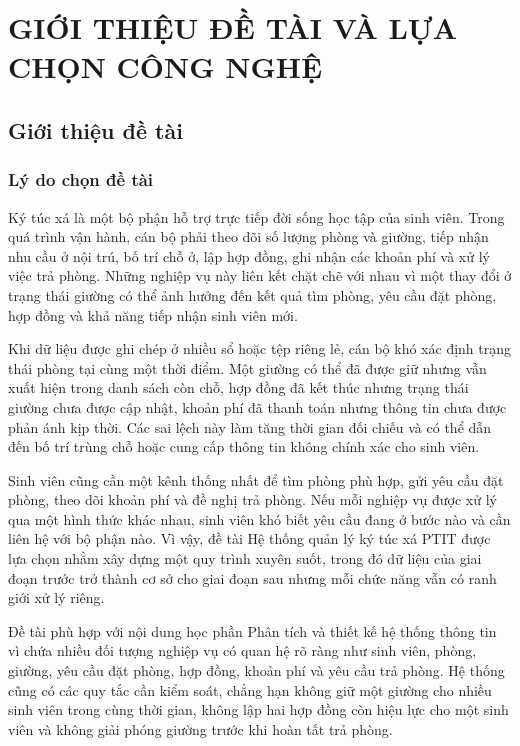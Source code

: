 \clearpage
\chapter{GIỚI THIỆU ĐỀ TÀI VÀ LỰA CHỌN CÔNG NGHỆ}

\section{Giới thiệu đề tài}

\subsection{Lý do chọn đề tài}

Ký túc xá là một bộ phận hỗ trợ trực tiếp đời sống học tập của sinh viên. Trong quá trình vận hành, cán bộ phải theo dõi số lượng phòng và giường, tiếp nhận nhu cầu ở nội trú, bố trí chỗ ở, lập hợp đồng, ghi nhận các khoản phí và xử lý việc trả phòng. Những nghiệp vụ này liên kết chặt chẽ với nhau vì một thay đổi ở trạng thái giường có thể ảnh hưởng đến kết quả tìm phòng, yêu cầu đặt phòng, hợp đồng và khả năng tiếp nhận sinh viên mới.

Khi dữ liệu được ghi chép ở nhiều sổ hoặc tệp riêng lẻ, cán bộ khó xác định trạng thái phòng tại cùng một thời điểm. Một giường có thể đã được giữ nhưng vẫn xuất hiện trong danh sách còn chỗ, hợp đồng đã kết thúc nhưng trạng thái giường chưa được cập nhật, khoản phí đã thanh toán nhưng thông tin chưa được phản ánh kịp thời. Các sai lệch này làm tăng thời gian đối chiếu và có thể dẫn đến bố trí trùng chỗ hoặc cung cấp thông tin không chính xác cho sinh viên.

Sinh viên cũng cần một kênh thống nhất để tìm phòng phù hợp, gửi yêu cầu đặt phòng, theo dõi khoản phí và đề nghị trả phòng. Nếu mỗi nghiệp vụ được xử lý qua một hình thức khác nhau, sinh viên khó biết yêu cầu đang ở bước nào và cần liên hệ với bộ phận nào. Vì vậy, đề tài Hệ thống quản lý ký túc xá PTIT được lựa chọn nhằm xây dựng một quy trình xuyên suốt, trong đó dữ liệu của giai đoạn trước trở thành cơ sở cho giai đoạn sau nhưng mỗi chức năng vẫn có ranh giới xử lý riêng.

Đề tài phù hợp với nội dung học phần Phân tích và thiết kế hệ thống thông tin vì chứa nhiều đối tượng nghiệp vụ có quan hệ rõ ràng như sinh viên, phòng, giường, yêu cầu đặt phòng, hợp đồng, khoản phí và yêu cầu trả phòng. Hệ thống cũng có các quy tắc cần kiểm soát, chẳng hạn không giữ một giường cho nhiều sinh viên trong cùng thời gian, không lập hai hợp đồng còn hiệu lực cho một sinh viên và không giải phóng giường trước khi hoàn tất trả phòng.

